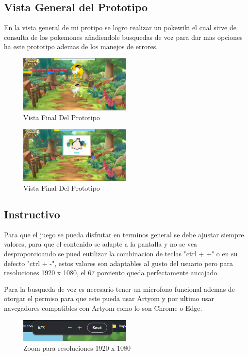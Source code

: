 \documentclass[conference]{IEEEtran}
\begin{document}
\subsection{Vista General del Prototipo}
En la vista general de mi protipo se logro realizar un pokewiki el cual sirve de consulta de los pokemones añadiendole busquedas de voz para dar mas opciones ha este prototipo ademas de los manejos de errores.

\begin{figure}[h] %
    \centering
    \includegraphics[width=0.5\textwidth]{images/PokeAPI View.png} %
    \caption{Vista Final Del Prototipo}
    \label{fig:mi_imagen}
\end{figure}

\begin{figure}[h] %
    \centering
    \includegraphics[width=0.5\textwidth]{images/Error 404 view.png} %
    \caption{Vista Final Del Prototipo}
    \label{fig:mi_imagen}
\end{figure}

\subsection{Instructivo}
Para que el juego se pueda disfrutar en terminos general se debe ajustar siempre valores, para que el contenido se adapte a la pantalla y no se vea desproporcioando se pued eutilizar la combinacion de teclas "ctrl + +" o en su defecto "ctrl + -", estos valores son adaptables al gusto del usuario pero para resoluciones 1920 x 1080, el 67 porciento queda perfectamente ancajado.

Para la busqueda de voz es necesario tener un microfono funcional ademas de otorgar el permiso para que este pueda usar Artyom y por ultimo usar navegadores compatibles con Artyom como lo son Chrome o Edge.
\begin{figure}[h] %
    \centering
    \includegraphics[width=0.5\textwidth]{images/67.png} %
    \caption{Zoom para resoluciones 1920 x 1080}
    \label{fig:mi_imagen}
\end{figure}
\end{document}
